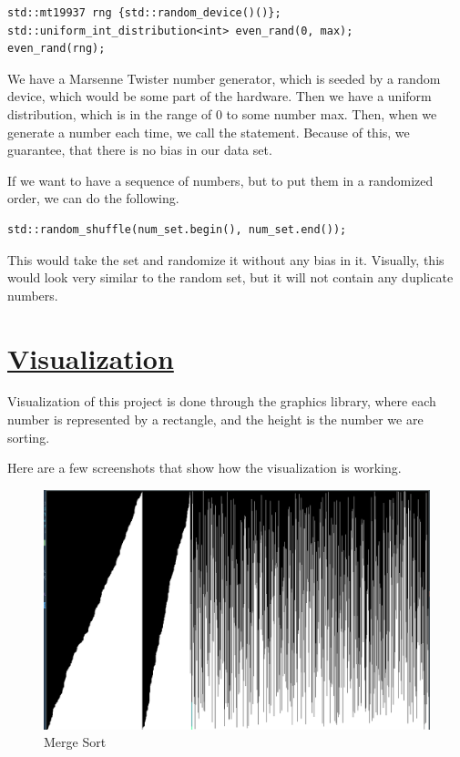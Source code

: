 \documentclass{article}
\newcommand{\code}[1]{\codeinline{\texttt{#1}}}
\begin{document}
\begin{lstlisting}
std::mt19937 rng {std::random_device()()};
std::uniform_int_distribution<int> even_rand(0, max);
even_rand(rng);
\end{lstlisting}

We have a Marsenne Twister number generator, which is seeded by a random device, which would be some part of the hardware. Then we have a uniform distribution, which is in the range of 0 to some number max. Then, when we generate a number each time, we call the \code{even\_rand(rng)} statement. Because of this, we guarantee, that there is no bias in our data set.

If we want to have a sequence of numbers, but to put them in a randomized order, we can do the following.

\begin{lstlisting}
std::random_shuffle(num_set.begin(), num_set.end());
\end{lstlisting}

This would take the set and randomize it without any bias in it. Visually, this would look very similar to the random set, but it will not contain any duplicate numbers.

\section{\underline{Visualization}}

Visualization of this project is done through the \code{SDL2} graphics library, where each number is represented by a rectangle, and the height is the number we are sorting.

Here are a few screenshots that show how the visualization is working.

\begin{figure}[H]
  \centering
  \includegraphics[width=\linewidth,scale=0.4]{./screenshot1.png}
  \caption{Merge Sort}
  \label{fig:Merge Sort}
\end{figure}
\end{document}
